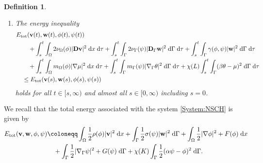 \documentclass[11pt,reqno]{amsart}
\newtheorem{definition}[theorem]{Definition}
\theoremstyle{remark}
\numberwithin{equation}{section}
\newcommand{\abs}[1]{|#1|}
\newcommand{\intO}{\int_\Omega}
\newcommand{\intG}{\int_\Gamma}
\newcommand{\dx}{\;\mathrm{d}x}
\newcommand{\dxtau}{\;\mathrm{d}x\;\mathrm{d}\tau}
\newcommand{\dGtau}{\;\mathrm{d}\Ga\;\mathrm{d}\tau}
\newcommand{\dG}{\;\mathrm d\Ga}
\newcommand{\Grad}{\nabla}
\newcommand{\Gradg}{\nabla_\Ga}
\newcommand{\Om}{\Omega}
\newcommand{\Ga}{\Gamma}
\newcommand{\bv}{\mathbf v}
\newcommand{\bw}{\mathbf w}
\newcommand{\D}{\mathbf D}
\newcommand{\Dg}{\mathbf D_\Ga}
\newcommand{\tot}{\textup{tot}}
\begin{document}
\begin{definition}
\begin{enumerate}[label=\textnormal{(\roman*)}, ref=\thetheorem(\roman*)]
\begin{align}
\begin{dcases}
                \intO\phi(t)\dx = \intO\phi_0\dx \quad\textnormal{and}\quad \intG\psi(t)\dG = \intG\psi_0\dG &\textnormal{if~} L = \infty
            \end{dcases}
        \end{align}
        for all $t\in[0,\infty)$.
        \item \label{NSCH:WeakSolution:EI} The energy inequality
        \begin{align}\label{NSCH:WeakSolution:EnergyInequality}
            &E_{\mathrm{tot}}(\bv(t),\bw(t),\phi(t),\psi(t)) \nonumber \\
            &\qquad + \int_s^t\intO 2\nu_\Om(\phi)\abs{\D\bv}^2\dxtau + \int_s^t\intG 2\nu_\Ga(\psi)\abs{\Dg\bw}^2\dGtau + \int_s^t\intG \gamma(\phi,\psi)\abs{\bw}^2 \dGtau \\
            &\qquad + \int_s^t\intO m_\Om(\phi)\abs{\Grad\mu}^2\dxtau + \int_s^t\intG m_\Ga(\psi)\abs{\Gradg\theta}^2\dGtau + \chi(L)\int_s^t\intG (\beta\theta - \mu)^2\dGtau \nonumber \\
            &\quad\leq E_\tot(\bv(s),\bw(s),\phi(s),\psi(s)) \nonumber
        \end{align}
        holds for all $t\in[s,\infty)$ and almost all $s\in[0,\infty)$ including $s = 0$.
    \end{enumerate}
\end{definition}

We recall that the total energy associated with the system \eqref{System:NSCH} is given by
\begin{align*}
	E_\tot(\bv,\bw,\phi,\psi) &\coloneqq \intO \frac12\rho(\phi)\abs{\bv}^2\dx + \intG \frac12\sigma(\psi)\abs{\bw}^2\dG + \intO \frac12\abs{\Grad\phi}^2 + F(\phi)\dx \\
	&\quad + \intG \frac12\abs{\Gradg\psi}^2 + G(\psi)\dG + \chi(K)\intG \frac12(\alpha\psi - \phi)^2\dG.
\end{align*}
\end{document}
